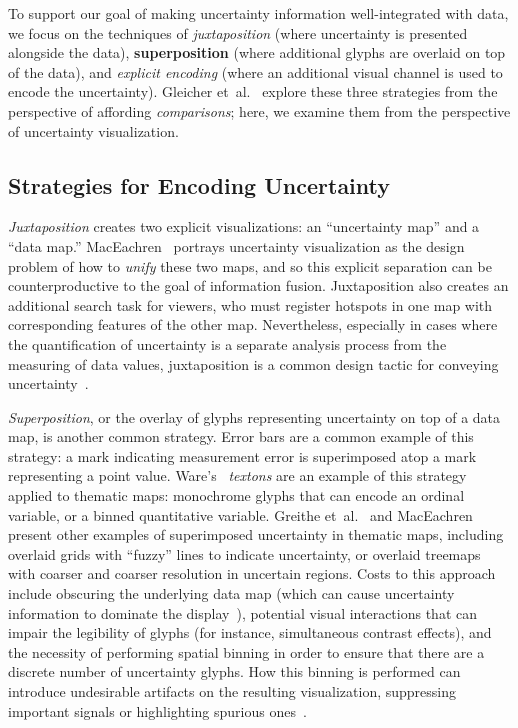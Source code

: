 \documentclass{vgtc}                          %
\newcommand{\ea}{{et~al.}\xspace}
\begin{document}
To support our goal of making uncertainty information well-integrated with data, we focus on the techniques of \emph{juxtaposition} (where uncertainty is presented alongside the data), \textbf{superposition} (where additional glyphs are overlaid on top of the data), and \emph{explicit encoding} (where an additional visual channel is used to encode the uncertainty). Gleicher \ea~\cite{gleicher2011visual} explore these three strategies from the perspective of affording \emph{comparisons}; here, we examine them from the perspective of uncertainty visualization.

\subsection{Strategies for Encoding Uncertainty}

\emph{Juxtaposition} creates two explicit visualizations: an ``uncertainty map'' and a ``data map.'' MacEachren~\cite{maceachren1992visualizing} portrays uncertainty visualization as the design problem of how to \emph{unify} these two maps, and so this explicit separation can be counterproductive to the goal of information fusion. Juxtaposition also creates an additional search task for viewers, who must register hotspots in one map with corresponding features of the other map. Nevertheless, especially in cases where the quantification of uncertainty is a separate analysis process from the measuring of data values, juxtaposition is a common design tactic for conveying uncertainty~\cite{moritz2017trust}.

\emph{Superposition}, or the overlay of glyphs representing uncertainty on top of a data map, is another common strategy. Error bars are a common example of this strategy: a mark indicating measurement error is superimposed atop a mark representing a point value. Ware's~\cite{ware2009quantitative} \emph{textons} are an example of this strategy applied to thematic maps: monochrome glyphs that can encode an ordinal variable, or a binned quantitative variable. Greithe \ea~\cite{griethe2006visualization} and MacEachren~\cite{maceachren1992visualizing,maceachren1998visualizing} present other examples of superimposed uncertainty in thematic maps, including overlaid grids with ``fuzzy'' lines to indicate uncertainty, or overlaid treemaps with coarser and coarser resolution in uncertain regions. Costs to this approach include obscuring the underlying data map (which can cause uncertainty information to dominate the display~\cite{brodlie2012review}), potential visual interactions that can impair the legibility of glyphs (for instance, simultaneous contrast effects), and the necessity of performing spatial binning in order to ensure that there are a discrete number of uncertainty glyphs. How this binning is performed can introduce undesirable artifacts on the resulting visualization, suppressing important signals or highlighting spurious ones~\cite{battersby2016shapes}.
\end{document}
